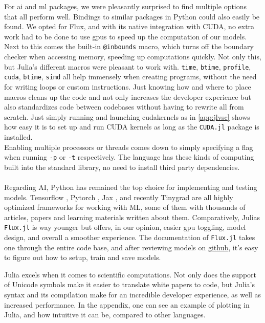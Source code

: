  For \acrshort{ai} and \acrshort{ml} packages, we were pleasantly surprised to find multiple options that all perform well. Bindings to similar packages in Python could also easily be found. We opted for Flux, and with its native integration with CUDA, no extra work had to be done to use \acrshort{gpu}s to speed up the computation of our models. \\

Next to this comes the built-in \texttt{@inbounds} macro, which turns off the boundary checker when accessing memory, speeding up computations quickly. Not only this, but Julia's different macros were pleasant to work with. \texttt{time}, \texttt{btime}, \texttt{profile}, \texttt{cuda}, \texttt{btime}, \texttt{simd} all help immensely when creating programs, without the need for writing loops or custom instructions. Just knowing how and where to place macros cleans up the code and not only increases the developer experience but also standardizes code between codebases without having to rewrite all from scratch. Just simply running and launching cudakernels as in \ref{app:jlvsc} shows how easy it is to set up and run CUDA kernels as long as the \texttt{CUDA.jl} package is installed. \\

Enabling multiple processors or threads comes down to simply specifying a flag when running \texttt{-p} or \texttt{-t} respectively. The language has these kinds of computing built into the standard library, no need to install third party dependencies. \\ \\

Regarding AI, Python has remained the top choice for implementing and testing models. Tensorflow \cite{abadi2016tensorflow}, Pytorch \cite{paszke2019pytorch}, Jax \cite{47008}, and recently Tinygrad \cite{tinygrad} are all highly optimized frameworks for working with ML, some of them with thousands of articles, papers and learning materials written about them. Comparatively, Julias \texttt{Flux.jl} is way younger but offers, in our opinion, easier \acrshort{gpu} toggling, model design, and overall a smoother experience. The documentation of \texttt{Flux.jl} takes one through the entire code base, and after reviewing models on \href{https://github.com/FluxML/model-zoo}{github}, it's easy to figure out how to setup, train and save models.

Julia excels when it comes to scientific computations. Not only does the support of Unicode symbols make it easier to translate white papers to code, but Julia's syntax and its compilation make for an incredible developer experience, as well as increased performance. In the appendix, one can see an example of plotting in Julia, and how intuitive it can be, compared to other languages. \\
 
